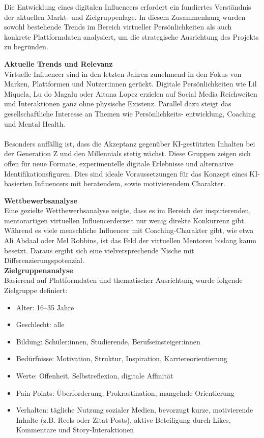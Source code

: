 \documentclass[a4paper,12pt]{article}
\begin{document}
Die Entwicklung eines digitalen Influencers erfordert ein fundiertes Verständnis der aktuellen Markt- und Zielgruppenlage. In diesem Zusammenhang wurden sowohl bestehende Trends im Bereich virtueller Persönlichkeiten als auch konkrete Plattformdaten analysiert, um die strategische Ausrichtung des Projekts zu begründen. 

\textbf{Aktuelle Trends und Relevanz} \\
Virtuelle Influencer sind in den letzten Jahren zunehmend in den Fokus von Marken, Plattformen und Nutzer:innen gerückt. Digitale Persönlichkeiten wie Lil Miquela, Lu do Magalu oder Aitana Lopez  erzielen auf Social Media Reichweiten und Interaktionen ganz ohne physische Existenz. Parallel dazu steigt das gesellschaftliche Interesse an Themen wie Persönlichkeits- entwicklung, Coaching und Mental Health. \\\\
Besonders auffällig ist, dass die Akzeptanz gegenüber KI-gestützten Inhalten bei der Generation Z und den Millennials stetig wächst. Diese Gruppen zeigen sich offen für neue Formate, experimentelle digitale Erlebnisse und alternative Identifikationsfiguren. Dies sind  ideale Voraussetzungen für das Konzept eines KI-basierten Influencers mit beratendem, sowie motivierendem Charakter. 

\textbf{Wettbewerbsanalyse} \\
Eine gezielte Wettbewerbsanalyse zeigte, dass es im Bereich der inspirierenden, mentorartigen virtuellen Influencerderzeit nur wenig direkte Konkurrenz gibt. Während es viele menschliche Influencer mit Coaching-Charakter gibt, wie etwa Ali Abdaal oder Mel Robbins, ist das Feld der virtuellen Mentoren bislang kaum besetzt. Daraus ergibt sich eine vielversprechende Nische mit Differenzierungspotenzial. \\

\textbf{Zielgruppenanalyse} \\
Basierend auf Plattformdaten und thematischer Ausrichtung wurde folgende Zielgruppe definiert:
\begin{itemize}
    \item Alter: 16–35 Jahre
    \item Geschlecht: alle
    \item Bildung: Schüler:innen, Studierende, Berufseinsteiger:innen
    \item Bedürfnisse: Motivation, Struktur, Inspiration, Karriereorientierung
    \item Werte: Offenheit, Selbstreflexion, digitale Affinität
    \item Pain Points: Überforderung, Prokrastination, mangelnde Orientierung
    \item Verhalten: tägliche Nutzung sozialer Medien, bevorzugt kurze, motivierende Inhalte (z.B. Reels oder Zitat-Posts), aktive Beteiligung durch Likes, Kommentare und Story-Interaktionen \\
\end{itemize} 
\end{document}
